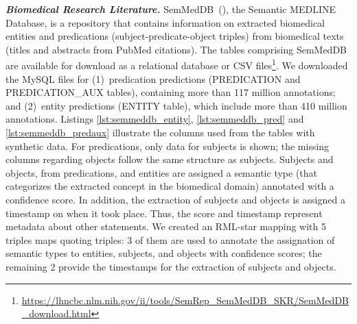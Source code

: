 

\noindent\textbf{\textit{Biomedical Research Literature.}} 
SemMedDB~(\cite{SemMedDB}), the Semantic MEDLINE Database, is a repository 
that contains information on extracted biomedical entities 
and predications (subject-predicate-object triples) 
from biomedical texts (titles and abstracts from PubMed citations). 
The tables comprising SemMedDB are available for download as a relational database or CSV files\footnote{ \url{https://lhncbc.nlm.nih.gov/ii/tools/SemRep_SemMedDB_SKR/SemMedDB_download.html}}.
We downloaded the MySQL files for (1)~predication predictions (PREDICATION and PREDICATION\_AUX tables), containing more than 117 million annotations; and (2)~entity predictions (ENTITY table), which include more than 410 million annotations.
Listings \ref{lst:semmeddb_entity}, \ref{lst:semmeddb_pred} and \ref{lst:semmeddb_predaux} illustrate the columns used from the tables with synthetic data. 
For predications, only data for subjects is shown; the missing columns regarding objects follow the same structure as subjects.
Subjects and objects, from predications, and entities are assigned a semantic type 
(that categorizes the extracted concept in the biomedical domain) annotated with a confidence score. 
In addition, the extraction of subjects and objects is assigned a timestamp on when it took place. 
Thus, the score and timestamp represent metadata about other statements.
We created an RML-star mapping with 5 triples maps quoting triples:
3 of them are used to annotate the assignation of semantic types to entities, subjects, and objects with confidence scores;
the remaining 2 provide the timestamps for the extraction of subjects and objects. 

